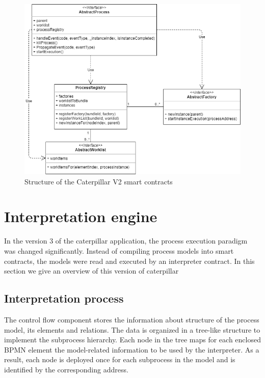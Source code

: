 \begin{figure}[hbt]
	\includegraphics[width=\textwidth]{gfx/caterpillar-compilation-contracts}
	\caption{Structure of the Caterpillar V2 smart contracts}
	\label{fig:caterpillar:v2:contracts}
\end{figure}

\section{Interpretation engine}
\label{sec:caterpillar:v3}

In the version 3 of the caterpillar application, the process execution paradigm was changed significantly. Instead of compiling process models into smart contracts, the models were read and executed by an interpreter contract. In this section we give an overview of this version of caterpillar

\subsection{Interpretation process}
\label{sec:caterpillar:v3:process}

The control flow component stores the information about structure of the process model, its elements and relations. The data is organized in a tree-like structure to implement the subprocess hierarchy. Each node in the tree maps for each enclosed BPMN element the model-related information to be used by the interpreter. As a result, each node is deployed once for each subprocess in the model and is identified by the corresponding address.

